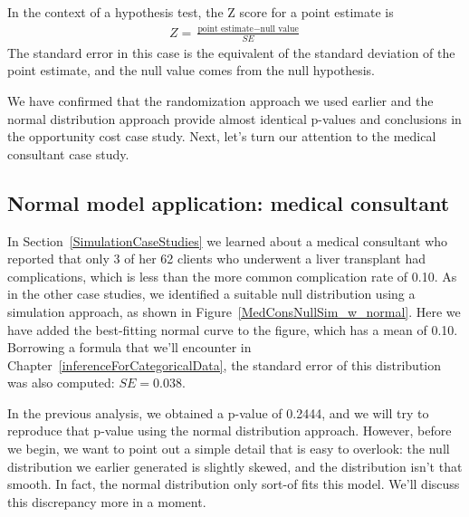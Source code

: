 \begin{termBox}{
In the context of a hypothesis test, the Z score for a point estimate is
\begin{align*}
Z = \frac{\text{point estimate} - \text{null value}}{SE}
\end{align*}
The standard error in this case is the equivalent of the standard deviation of the point estimate, and the null value comes from the null hypothesis.}
\end{termBox}

We have confirmed that the randomization approach we used earlier and the normal distribution approach provide almost identical p-values and conclusions in the opportunity cost case study. Next, let's turn our attention to the medical consultant case study.


\subsection{Normal model application: medical consultant}

In Section~\ref{SimulationCaseStudies} we learned about a medical consultant who reported that only 3 of her 62 clients who underwent a liver transplant had complications, which is less than the more common complication rate of 0.10. As in the other case studies, we identified a suitable null distribution using a simulation approach, as shown in Figure~\ref{MedConsNullSim_w_normal}. Here we have added the best-fitting normal curve to the figure, which has a mean of 0.10. Borrowing a formula that we'll encounter in Chapter~\ref{inferenceForCategoricalData}, the standard error of this distribution was also computed: $SE = 0.038$.

In the previous analysis, we obtained a p-value of 0.2444, and we will try to reproduce that p-value using the normal distribution approach. However, before we begin, we want to point out a simple detail that is easy to overlook: the null distribution we earlier generated is slightly skewed, and the distribution isn't that smooth. In fact, the normal distribution only sort-of fits this model. We'll discuss this discrepancy more in a moment.

